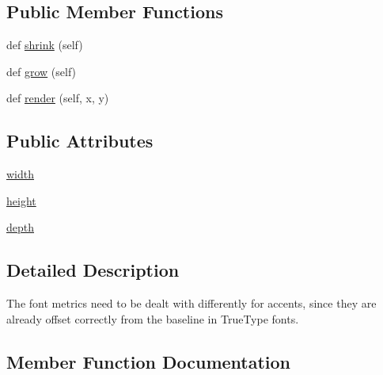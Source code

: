 \subsection*{Public Member Functions}
\begin{DoxyCompactItemize}
\item 
def \hyperlink{classmatplotlib_1_1__mathtext_1_1Accent_a1b741359011425ebdd793ca352af7c81}{shrink} (self)
\item 
def \hyperlink{classmatplotlib_1_1__mathtext_1_1Accent_ab0b4ecc41523f77b706dae9409945dd0}{grow} (self)
\item 
def \hyperlink{classmatplotlib_1_1__mathtext_1_1Accent_a733af2b32fa82b888aaab0f4b784705e}{render} (self, x, y)
\end{DoxyCompactItemize}
\subsection*{Public Attributes}
\begin{DoxyCompactItemize}
\item 
\hyperlink{classmatplotlib_1_1__mathtext_1_1Accent_abf66875564796d0d6e1860dedcdd7172}{width}
\item 
\hyperlink{classmatplotlib_1_1__mathtext_1_1Accent_ad0b00c111def8a0d0b52d6a005c25267}{height}
\item 
\hyperlink{classmatplotlib_1_1__mathtext_1_1Accent_a1c405a80ae02cb85e595f01ca998a326}{depth}
\end{DoxyCompactItemize}


\subsection{Detailed Description}
\begin{DoxyVerb}The font metrics need to be dealt with differently for accents,
since they are already offset correctly from the baseline in
TrueType fonts.
\end{DoxyVerb}
 

\subsection{Member Function Documentation}
\mbox{\label{classmatplotlib_1_1__mathtext_1_1Accent_ab0b4ecc41523f77b706dae9409945dd0}} 
